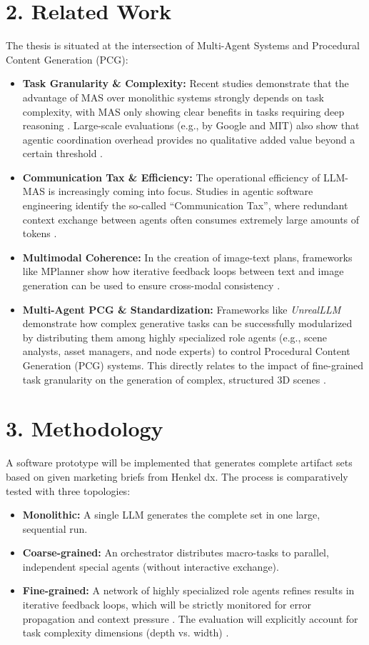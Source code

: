 \documentclass[12pt,a4paper]{article}
\begin{document}
\section*{2. Related Work}
The thesis is situated at the intersection of Multi-Agent Systems and Procedural Content Generation (PCG):
\begin{itemize}
    \item \textbf{Task Granularity \& Complexity:} Recent studies demonstrate that the advantage of MAS over monolithic systems strongly depends on task complexity, with MAS only showing clear benefits in tasks requiring deep reasoning \cite{tang2025}. Large-scale evaluations (e.g., by Google and MIT) also show that agentic coordination overhead provides no qualitative added value beyond a certain threshold \cite{kim2025}.
    \item \textbf{Communication Tax \& Efficiency:} The operational efficiency of LLM-MAS is increasingly coming into focus. Studies in agentic software engineering identify the so-called ``Communication Tax'', where redundant context exchange between agents often consumes extremely large amounts of tokens \cite{salim2026}.
    \item \textbf{Multimodal Coherence:} In the creation of image-text plans, frameworks like MPlanner show how iterative feedback loops between text and image generation can be used to ensure cross-modal consistency \cite{lu2025}.
    \item \textbf{Multi-Agent PCG \& Standardization:} Frameworks like \textit{UnrealLLM} demonstrate how complex generative tasks can be successfully modularized by distributing them among highly specialized role agents (e.g., scene analysts, asset managers, and node experts) to control Procedural Content Generation (PCG) systems. This directly relates to the impact of fine-grained task granularity on the generation of complex, structured 3D scenes \cite{tang_unreal_2025}.
\end{itemize}

\section*{3. Methodology}
A software prototype will be implemented that generates complete artifact sets based on given marketing briefs from Henkel dx. The process is comparatively tested with three topologies:
\begin{itemize}
    \item \textbf{Monolithic:} A single LLM generates the complete set in one large, sequential run.
    \item \textbf{Coarse-grained:} An orchestrator distributes macro-tasks to parallel, independent special agents (without interactive exchange).
    \item \textbf{Fine-grained:} A network of highly specialized role agents refines results in iterative feedback loops, which will be strictly monitored for error propagation and context pressure \cite{kim2025}. The evaluation will explicitly account for task complexity dimensions (depth vs. width) \cite{tang2025}.
\end{itemize}
\end{document}
